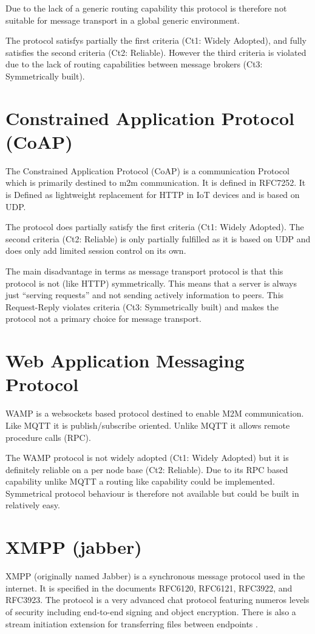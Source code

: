 \documentclass[a4paper,appendixprefix,pdfusetitle,twocolumn,draft,8pt]{scrbook}
\begin{document}
Due to the lack of a generic routing capability this protocol is therefore not suitable for message transport in a global generic environment.

The protocol satisfys partially the first criteria (Ct1: Widely Adopted), and fully satisfies the second criteria (Ct2: Reliable). However the third criteria is violated due to the lack of routing capabilities between message brokers (Ct3: Symmetrically built).

\section{Constrained Application Protocol (CoAP)}
The Constrained Application Protocol (CoAP) is a communication Protocol which is primarily destined to m2m communication. It is defined in RFC7252\cite{RFC7252}.  It is Defined as lightweight replacement for HTTP in IoT devices and is based on UDP.

The protocol does partially satisfy the first criteria (Ct1: Widely Adopted). The second criteria (Ct2: Reliable) is only partially fulfilled as it is based on UDP and does only add limited session control on its own.

The main disadvantage in terms as message transport protocol is that this protocol is not (like HTTP) symmetrically. This means that a server is always just ``serving requests'' and not sending actively information to peers. This Request-Reply violates criteria (Ct3: Symmetrically built) and makes the protocol not a primary choice for  message transport. 

\section{Web Application Messaging Protocol}
WAMP is a websockets based protocol destined to enable M2M communication. Like MQTT it is publish/subscribe oriented. Unlike MQTT it allows remote procedure calls (RPC).

The WAMP protocol is not widely adopted (Ct1: Widely Adopted) but it is definitely reliable on a per node base (Ct2: Reliable). Due to its RPC based capability unlike MQTT a routing like capability could be implemented. Symmetrical protocol behaviour is therefore not available but could be built in relatively easy.

\section{XMPP (jabber)}
XMPP (originally named Jabber) is a synchronous message protocol used in the internet. It is specified in the documents RFC6120\cite{RFC6120}, RFC6121\cite{RFC6120}, RFC3922\cite{RFC3922}, and RFC3923\cite{RFC3923}. The protocol is a very advanced chat protocol featuring numeros levels of security including end-to-end signing and object encryption\cite{RFC3923}. There is also a stream initiation extension for transferring files between endpoints \cite{xep0096}.
\end{document}
